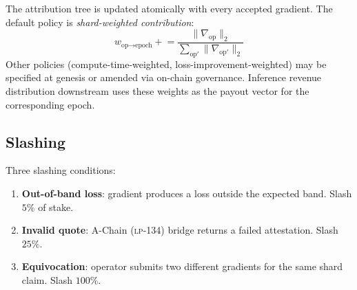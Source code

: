 The attribution tree is updated atomically with every accepted gradient. The default policy is \emph{shard-weighted contribution}:
\begin{equation}
w_{\text{op} \to \text{epoch}} \mathrel{+}= \frac{\|\nabla_{\text{op}}\|_2}{\sum_{\text{op}'} \|\nabla_{\text{op}'}\|_2}
\end{equation}
Other policies (compute-time-weighted, loss-improvement-weighted) may be specified at genesis or amended via on-chain governance. Inference revenue distribution downstream uses these weights as the payout vector for the corresponding epoch.

\subsection{Slashing}

Three slashing conditions:
\begin{enumerate}[nosep]
\item \textbf{Out-of-band loss}: gradient produces a loss outside the expected band. Slash $5\%$ of stake.
\item \textbf{Invalid \TEE{} quote}: A-Chain (\textsc{lp-134}) bridge returns a failed attestation. Slash $25\%$.
\item \textbf{Equivocation}: operator submits two different gradients for the same shard claim. Slash $100\%$.
\end{enumerate}
